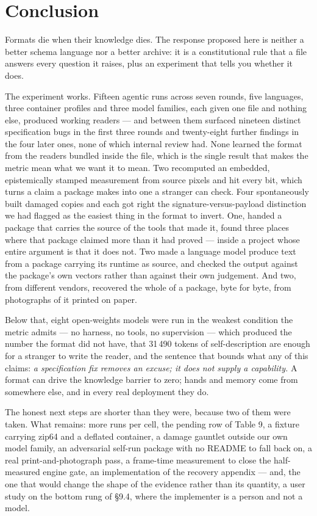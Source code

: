 \documentclass[10pt,twocolumn,letterpaper]{article}
\begin{document}
\section{Conclusion}

Formats die when their knowledge dies. The response proposed here is neither a better schema language nor a better archive: it is a constitutional rule that a file answers every question it raises, plus an experiment that tells you whether it does.

The experiment works. Fifteen agentic runs across seven rounds, five languages, three container profiles and three model families, each given one file and nothing else, produced working readers --- and between them surfaced nineteen distinct specification bugs in the first three rounds and twenty-eight further findings in the four later ones, none of which internal review had. None learned the format from the readers bundled inside the file, which is the single result that makes the metric mean what we want it to mean. Two recomputed an embedded, epistemically stamped measurement from source pixels and hit every bit, which turns a claim a package makes into one a stranger can check. Four spontaneously built damaged copies and each got right the signature-versus-payload distinction we had flagged as the easiest thing in the format to invert. One, handed a package that carries the source of the tools that made it, found three places where that package claimed more than it had proved --- inside a project whose entire argument is that it does not. Two made a language model produce text from a package carrying its runtime as source, and checked the output against the package's own vectors rather than against their own judgement. And two, from different vendors, recovered the whole of a package, byte for byte, from photographs of it printed on paper.

Below that, eight open-weights models were run in the weakest condition the metric admits --- no harness, no tools, no supervision --- which produced the number the format did not have, that 31\,490 tokens of self-description are enough for a stranger to write the reader, and the sentence that bounds what any of this claims: \emph{a specification fix removes an excuse; it does not supply a capability.} A format can drive the knowledge barrier to zero; hands and memory come from somewhere else, and in every real deployment they do.

The honest next steps are shorter than they were, because two of them were taken. What remains: more runs per cell, the pending row of Table 9, a fixture carrying zip64 and a deflated container, a damage gauntlet outside our own model family, an adversarial self-run package with no README to fall back on, a real print-and-photograph pass, a frame-time measurement to close the half-measured engine gate, an implementation of the recovery appendix --- and, the one that would change the shape of the evidence rather than its quantity, a user study on the bottom rung of \S9.4, where the implementer is a person and not a model.
\end{document}
